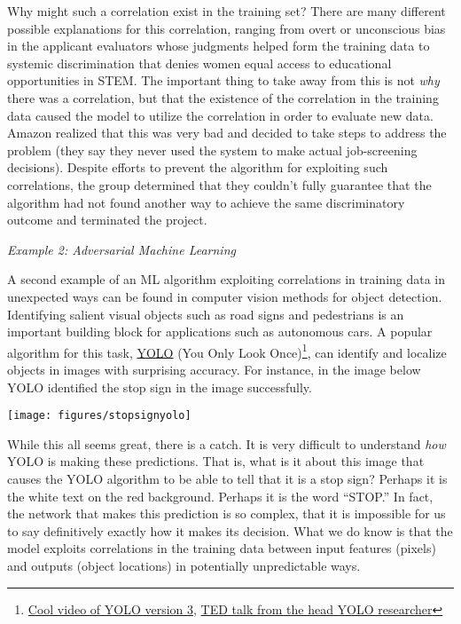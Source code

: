 \documentclass[assignment01_Solutions]{subfiles}
\begin{document}
Why might such a correlation exist in the training set?  There are many different possible explanations for this correlation, ranging from overt or unconscious bias in the applicant evaluators whose judgments helped form the training data to systemic discrimination that denies women equal access to educational opportunities in STEM.  The important thing to take away from this is not \emph{why} there was a correlation, but that the existence of the correlation in the training data caused the model to utilize the correlation in order to evaluate new data.  Amazon realized that this was very bad and decided to take steps to address the problem (they say they never used the system to make actual job-screening decisions).  Despite efforts to prevent the algorithm for exploiting such correlations, the group determined that they couldn't fully guarantee that the algorithm had not found another way to achieve the same discriminatory outcome and terminated the project.


\item \emph{Example 2: Adversarial Machine Learning}

A second example of an ML algorithm exploiting correlations in training data in unexpected ways can be found in computer vision methods for object detection.  Identifying salient visual objects such as road signs and pedestrians is an important building block for applications such as autonomous cars.  A popular algorithm for this task, \href{https://pjreddie.com/darknet/yolo/}{YOLO} (You Only Look Once)\footnote{\href{https://www.youtube.com/watch?time_continue=77&v=MPU2HistivI}{Cool video of YOLO version 3}, \href{https://www.youtube.com/watch?v=Cgxsv1riJhI}{TED talk from the head YOLO researcher}}, can identify and localize objects in images with surprising accuracy.  For instance, in the image below YOLO identified the stop sign in the image successfully.
\begin{center}
\texttt{[image: figures/stopsignyolo]}
\end{center}

While this all seems great, there is a catch.  It is very difficult to understand \emph{how} YOLO is making these predictions.  That is, what is it about this image that causes the YOLO algorithm to be able to tell that it is a stop sign?  Perhaps it is the white text on the red background.  Perhaps it is the word ``STOP.''  In fact, the network that makes this prediction is so complex, that it is impossible for us to say definitively exactly how it makes its decision.  What we do know is that the model exploits correlations in the training data between input features (pixels) and outputs (object locations) in potentially unpredictable ways.
\end{document}

